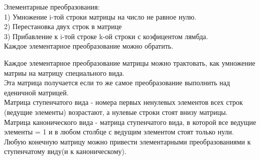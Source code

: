 \documentclass[a4paper,12pt]{article}
\begin{document}
Элементарные преобразования:\\
1) Умножение i-той строки матрицы на число не равное нулю.\\
2) Перестановка двух строк в матрице\\
3) Прибавление к i-той строке k-ой строки с коэфицентом лямбда.\\

Каждое элементарное преобразование можно обратить.

Каждое элементарное преобразование матрицы можно трактовать, как умножение матриы на матрицу специального вида.\\
Эта матрица получается если то же самое преобразование выполнить над еденичной матрицей.\\
Матрица ступенчатого вида - номера первых ненулевых элементов всех строк (ведущие элементы) возрастают, а нулевые строки стоят внизу матрицы.\\
Матрица канонического вида - матрица ступенчатого вида, в которой все ведущие элементы = 1 и в любом столбце с ведущим элементом стоят только нули.\\

Любую конечную матрицу можно привести элементарными преобразованиями к ступенчатому виду(и к каноническому).
\end{document}
